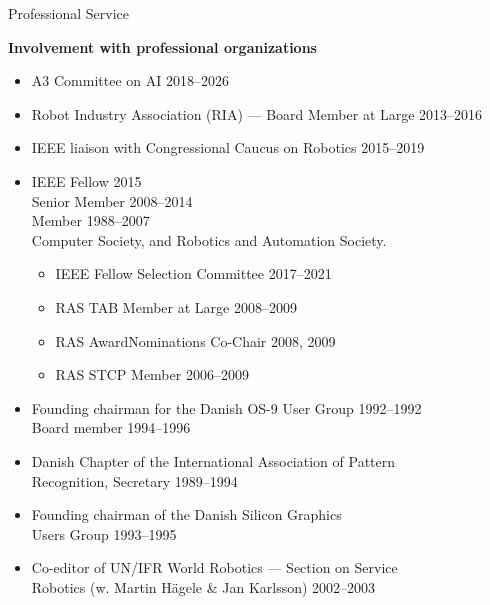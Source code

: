 \documentclass{article}
\begin{document}
\begin{cv}
\begin{cvlist}{Professional Service}
		\item {\bf Involvement with professional organizations}
		\begin{itemize}
			\item A3 Committee on AI \cftdotfill{\cftdotsep} 2018--2026
			\item Robot Industry Association (RIA) --- Board Member at Large
			      \cftdotfill{\cftdotsep} 2013--2016
			\item IEEE liaison with Congressional Caucus on Robotics
			      \cftdotfill{\cftdotsep}  2015--2019
			\item IEEE Fellow \cftdotfill{\cftdotsep} 2015\\
			      Senior Member \cftdotfill{\cftdotsep} 2008--2014\\
			      Member \cftdotfill{\cftdotsep} 1988--2007\\
			      Computer Society, and Robotics and Automation Society.
			      \begin{itemize}
				      \item IEEE Fellow Selection Committee \cftdotfill{\cftdotsep} 2017--2021
				      \item RAS TAB Member at Large \cftdotfill{\cftdotsep} 2008--2009
				      \item RAS AwardNominations Co-Chair \cftdotfill{\cftdotsep} 2008, 2009
				      \item RAS STCP Member \cftdotfill{\cftdotsep} 2006--2009
			      \end{itemize}
			\item Founding chairman for the Danish OS-9 User Group
			      \cftdotfill{\cftdotsep} 1992--1992\\ Board member
			      \cftdotfill{\cftdotsep} 1994--1996
			\item Danish Chapter of the International Association of
			      Pattern\\ Recognition, Secretary \cftdotfill{\cftdotsep}
			      1989--1994
			\item Founding chairman of the Danish Silicon Graphics \\Users Group
			      \cftdotfill{\cftdotsep} 1993--1995
			\item Co-editor of UN/IFR World Robotics --- Section on
			      Service\\ Robotics (w. Martin H\"agele \& Jan Karlsson)
			      \cftdotfill{\cftdotsep} 2002--2003
		\end{itemize}


\end{cvlist}
\end{cv}
\end{document}
